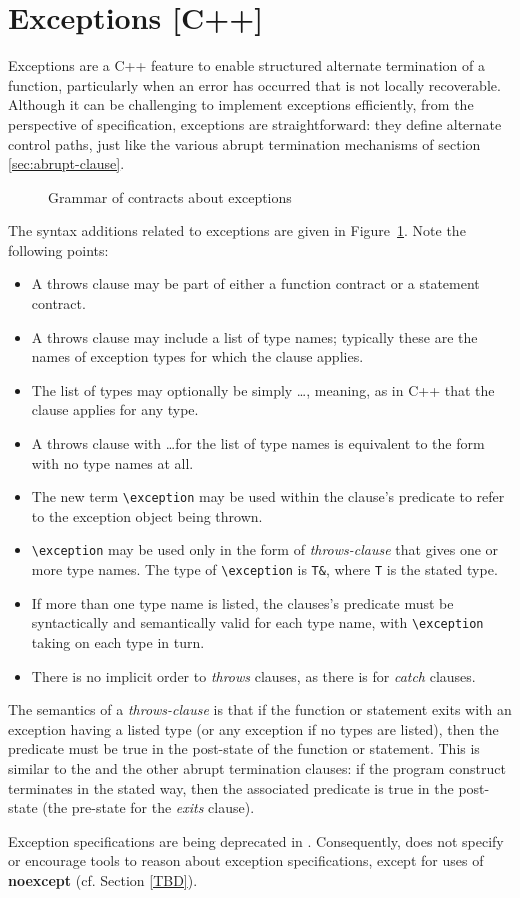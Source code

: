 \section{Exceptions [C++]}
\label{sec:exceptions}

Exceptions are a C++ feature to enable structured alternate termination of a function, particularly when an error has occurred that is not locally recoverable. Although it can be challenging to implement exceptions efficiently, from the perspective of specification, exceptions are straightforward: they define alternate control paths, just like the various abrupt termination mechanisms of section \ref{sec:abrupt-clause}.

\begin{figure}[t]
	\begin{cadre}
		
	\end{cadre}
	\caption{Grammar of contracts about exceptions}
	\label{fig:gram:throws-clause}
\end{figure}


The syntax additions related to exceptions are given in 
Figure~\ref{fig:gram:throws-clause}. Note the following points:
\begin{itemize}
\item A throws clause may be part of either a function contract or a statement contract.
\item A throws clause may include a list of type names; typically these are the names of exception types for which the
clause applies.
\item The list of types may optionally be simply \ldots, meaning, as in C++ that the clause applies for any type.
\item A throws clause with \ldots for the list of type names is equivalent to the form with no type names at all.
\item The new term \lstinline|\exception| may be used within the clause's predicate to refer to the exception object being thrown. 
\item \lstinline|\exception| may be used only in the form of \textsl{throws-clause} that gives one or more type names. The type of \lstinline|\exception| is \lstinline|T&|, where \lstinline|T| is the stated type.
\item If more than one type name is listed, the clauses's predicate must be syntactically and semantically valid for each type name, with \lstinline|\exception| taking on each type in turn.
\item There is no implicit order to \textsl{throws} clauses, as there is for \textsl{catch} clauses.
\end{itemize}
The semantics of a \textsl{throws-clause} is that if the function or statement exits with an exception having a listed type (or any exception if no types are listed), then the predicate must be true in the post-state of the function or statement. This is similar to the \ensures and the other abrupt termination clauses: if the program construct terminates in the stated way, then the associated predicate is true in the post-state (the pre-state for the \textsl{exits} clause).

Exception specifications are being deprecated in \lang. Consequently, \NAME{} does not specify or encourage tools to reason about \lang{} exception specifications, except for  uses of \textbf{noexcept} (cf. Section \ref{TBD}).

